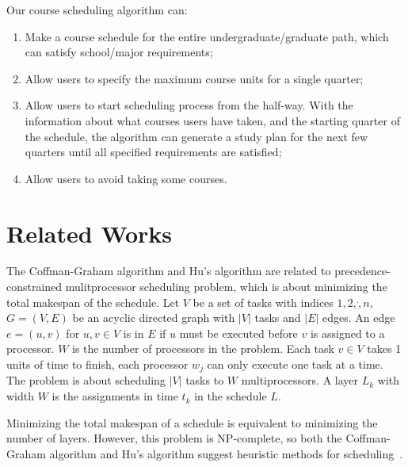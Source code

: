 \documentclass[letterpaper,12pt]{article}
\theoremstyle{definition}
\begin{document}
Our course scheduling algorithm can:
\begin{enumerate}
\item Make a course schedule for the entire undergraduate/graduate path, which can satisfy school/major requirements;
\item Allow users to specify the maximum course units for a single quarter;
\item Allow users to start scheduling process from the half-way. With the information about what courses users have taken, and the starting quarter of the schedule, the algorithm can generate a study plan for the next few quarters until all specified requirements are satisfied; 
\item Allow users to avoid taking some courses.
\end{enumerate}
\section{Related Works}
The Coffman-Graham algorithm and Hu's algorithm are related to precedence-constrained mulitprocessor scheduling problem, which is about minimizing the total makespan of the schedule. 
Let $V$ be a set of tasks with indices $1,2,\dot, n$, $G=(V,E)$ be an acyclic directed graph with $|V|$ tasks and $|E|$ edges. 
An edge $e=(u,v)$ for $u,v\in V$ is in $E$ if $u$ must be executed before $v$ is assigned to a processor. $W$ is the number of processors in the problem. Each task $v \in V$ takes 1 units of time to finish, each processor $w_j$ can only execute one task at a time. 
The problem is about scheduling $|V|$ tasks to $W$ multiprocessors. A layer $L_k$ with width $W$ is the assignments in time $t_k$ in the schedule $L$. 

Minimizing the total makespan of a schedule is equivalent to minimizing the number of layers. However, this problem is NP-complete, so both the Coffman-Graham algorithm and Hu's algorithm suggest heuristic methods for scheduling~\cite{battista_chapter_1998}.
\end{document}
